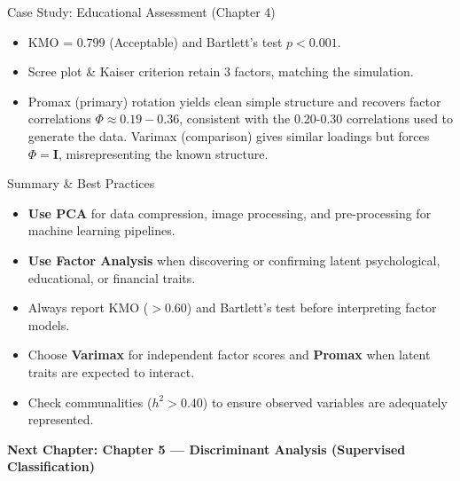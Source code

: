 \documentclass[aspectratio=169,ignorenonframetext]{beamer}
\begin{document}
\begin{frame}[shrink]{Case Study: Educational Assessment (Chapter 4)}
\begin{itemize}
\item
  KMO = \(0.799\) (Acceptable) and Bartlett's test \(p < 0.001\).
\item
  Scree plot \& Kaiser criterion retain 3 factors, matching the
  simulation.
\item
  Promax (primary) rotation yields clean simple structure and recovers
  factor correlations \(\Phi \approx 0.19 - 0.36\), consistent with the
  0.20-0.30 correlations used to generate the data. Varimax (comparison)
  gives similar loadings but forces \(\Phi = \mathbf{I}\),
  misrepresenting the known structure.
\end{itemize}
\end{frame}

\begin{frame}{Summary \& Best Practices}
\begin{itemize}
\item
  \textbf{Use PCA} for data compression, image processing, and
  pre-processing for machine learning pipelines.
\item
  \textbf{Use Factor Analysis} when discovering or confirming latent
  psychological, educational, or financial traits.
\item
  Always report KMO (\(> 0.60\)) and Bartlett's test before interpreting
  factor models.
\item
  Choose \textbf{Varimax} for independent factor scores and
  \textbf{Promax} when latent traits are expected to interact.
\item
  Check communalities (\(h^{2} > 0.40\)) to ensure observed variables
  are adequately represented.
\end{itemize}

{ \textbf{Next Chapter: Chapter 5 --- Discriminant Analysis (Supervised
Classification)} }
\end{frame}
\end{document}
